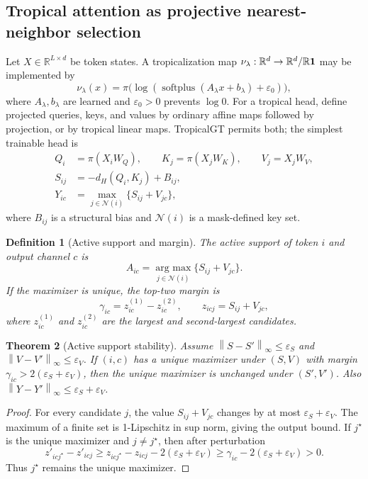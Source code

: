 \documentclass[11pt]{article}
\newtheorem{definition}{Definition}[section]
\newtheorem{theorem}[definition]{Theorem}
\newcommand{\R}{\mathbb{R}}
\newcommand{\calN}{\mathcal{N}}
\newcommand{\argmax}{\operatorname*{arg\ max}}
\newcommand{\norm}[1]{\left\lVert #1\right\rVert}
\newcommand{\eps}{\varepsilon}
\begin{document}
\subsection{Tropical attention as projective nearest-neighbor selection}

Let \(X\in\R^{L\times d}\) be token states.  A tropicalization map \(\nu_\lambda:\R^d\to\R^d/\R{\bf 1}\) may be implemented by
\begin{equation}
\nu_\lambda(x)=\pi\bigl(\log(\operatorname{softplus}(A_\lambda x+b_\lambda)+\eps_0)\bigr),
\end{equation}
where \(A_\lambda,b_\lambda\) are learned and \(\eps_0>0\) prevents \(\log 0\).  For a tropical head, define projected queries, keys, and values by ordinary affine maps followed by projection, or by tropical linear maps.  TropicalGT permits both; the simplest trainable head is
\begin{align}
Q_i&=\pi(X_iW_Q),\qquad K_j=\pi(X_jW_K),\qquad V_j=X_jW_V,\nonumber\\
S_{ij}&=-d_H(Q_i,K_j)+B_{ij},\nonumber\\
Y_{ic}&=\max_{j\in\calN(i)}\{S_{ij}+V_{jc}\},
\end{align}
where \(B_{ij}\) is a structural bias and \(\calN(i)\) is a mask-defined key set.

\begin{definition}[Active support and margin]
The active support of token \(i\) and output channel \(c\) is
\begin{equation}
A_{ic}=\argmax_{j\in\calN(i)}\{S_{ij}+V_{jc}\}.
\end{equation}
If the maximizer is unique, the top-two margin is
\begin{equation}
\gamma_{ic}=z^{(1)}_{ic}-z^{(2)}_{ic},\qquad z_{icj}=S_{ij}+V_{jc},
\end{equation}
where \(z^{(1)}_{ic}\) and \(z^{(2)}_{ic}\) are the largest and second-largest candidates.
\end{definition}

\begin{theorem}[Active support stability]
Assume \(\norm{S-S'}_\infty\le \eps_S\) and \(\norm{V-V'}_\infty\le \eps_V\).  If \((i,c)\) has a unique maximizer under \((S,V)\) with margin \(\gamma_{ic}>2(\eps_S+\eps_V)\), then the unique maximizer is unchanged under \((S',V')\).  Also \(\norm{Y-Y'}_\infty\le \eps_S+\eps_V\).
\end{theorem}
\begin{proof}
For every candidate \(j\), the value \(S_{ij}+V_{jc}\) changes by at most \(\eps_S+\eps_V\).  The maximum of a finite set is 1-Lipschitz in sup norm, giving the output bound.  If \(j^\star\) is the unique maximizer and \(j\ne j^\star\), then after perturbation
\begin{equation}
z'_{icj^\star}-z'_{icj}\ge z_{icj^\star}-z_{icj}-2(\eps_S+\eps_V)\ge \gamma_{ic}-2(\eps_S+\eps_V)>0.
\end{equation}
Thus \(j^\star\) remains the unique maximizer.
\end{proof}
\end{document}
